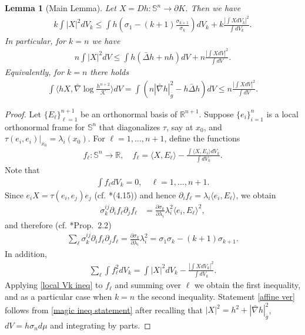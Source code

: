 \documentclass[12pt]{amsart}
\newtheorem{lemma}[theorem]{Lemma}
\theoremstyle{definition}
\numberwithin{equation}{section}
\newcommand{\Sn}{\mathbb{S}^n}
\theoremstyle{remark}
\numberwithin{equation}{section}
\begin{document}
\begin{lemma}[Main Lemma]\label{magic inequality}
Let $X=Dh: \Sn\to \partial K$. Then we have
\begin{align*}
k\int |X|^2 dV_k\leq \int h \left ( \sigma_1-(k+1)\frac{\sigma_{k+1}}{\sigma_k} \right )dV_k +k\frac{|\int X dV_k|^2}{\int dV_k}.
\end{align*}
In particular, for $k=n$ we have
\begin{align}\label{magic ineq statement}
n\int|X|^2dV\leq \int h (\bar{\Delta}h+nh)dV+n\frac{\left|\int X dV\right|^2}{\int dV} .
\end{align}
Equivalently, for $k=n$ there holds
\begin{align}\label{affine ver}
\int \langle hX, \bar{\nabla}\log \frac{h^{n+2}}{\mathcal{K}} \rangle dV = \int (n|\bar\nabla h|_{\bar g}^2 - h \bar \Delta h) dV \leq n\frac{|\int XdV|^2}{\int dV}.
\end{align}
\end{lemma}
\begin{proof}Let $\{E_\ell\}_{\ell=1}^{n+1}$ be an orthonormal basis of $\mathbb{R}^{n+1}$. Suppose $\{e_i\}_{i=1}^n$ is a local orthonormal frame for $\Sn$ that diagonalizes $\tau$, say at $x_0$, and $\tau(e_i,e_i)|_{x_0}=\lambda_i(x_0)$. For $ \ell=1,\ldots,n+1$, define the functions
\begin{align*}
f_{\ell}:\Sn\to \mathbb{R},\quad
f_{\ell}=\langle X,E_\ell\rangle-\frac{\int \langle X,E_\ell\rangle dV_k}{\int dV_k}.
\end{align*}
Note that 
\begin{align*}
\int f_\ell dV_k =0,\quad \ell=1,\ldots,n+1.
\end{align*}
Since $e_iX = \tau(e_i,e_j)e_j$ (cf. \cite{CY76}*{(4.15)}) and hence $\partial_i f_\ell = \lambda_i \langle e_i,E_\ell  \rangle$, we obtain
\begin{align*}
\sigma_k^{ij}\partial_i f_\ell \partial_j f_\ell &=\frac{\partial \sigma_k}{\partial \lambda_i}\lambda_i^2\langle e_i,E_\ell \rangle^2,
\end{align*}
and therefore (cf. \cite{HS99}*{Prop.~2.2})
\begin{align*}
\sum_\ell \sigma_k^{ij}\partial_i f_\ell \partial_j f_\ell =\frac{\partial \sigma_k}{\partial \lambda_i}\lambda_i^2=\sigma_1\sigma_k-(k+1)\sigma_{k+1} .
\end{align*}
In addition,
\begin{align*}
\sum_\ell \int f_\ell ^2 dV_k =\int |X|^2 dV_k  -\frac{|\int X dV_k|^2}{\int dV_k}.
\end{align*}
Applying \autoref{local Vk ineq} to $f_{\ell}$ and summing over $\ell$ we obtain the first inequality, and as a particular case when $k=n$ the second inequality. Statement \eqref{affine ver} follows from \eqref{magic ineq statement} after recalling that $|X|^2 = h^2 + |\bar \nabla h|^2_{\bar g}$, $dV = h\sigma_nd\mu$ and integrating by parts.
\end{proof}
\end{document}
